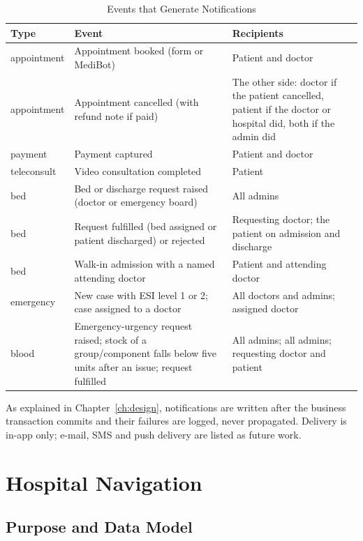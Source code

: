 \begin{table}[H]
\centering
\caption{Events that Generate Notifications}
\label{tab:notiftypes}
\renewcommand{\arraystretch}{1.2}
\begin{tabular}{|L{2.4cm}|L{5.8cm}|L{5.3cm}|}
\hline
{}
\textbf{Type} & \textbf{Event} & \textbf{Recipients} \\
\hline
appointment & Appointment booked (form or MediBot) & Patient and doctor \\
\hline
appointment & Appointment cancelled (with refund note if paid) & The other side: doctor if the patient cancelled, patient if the doctor or hospital did, both if the admin did \\
\hline
payment & Payment captured & Patient and doctor \\
\hline
teleconsult & Video consultation completed & Patient \\
\hline
bed & Bed or discharge request raised (doctor or emergency board) & All admins \\
\hline
bed & Request fulfilled (bed assigned or patient discharged) or rejected & Requesting doctor; the patient on admission and discharge \\
\hline
bed & Walk-in admission with a named attending doctor & Patient and attending doctor \\
\hline
emergency & New case with ESI level 1 or 2; case assigned to a doctor & All doctors and admins; assigned doctor \\
\hline
blood & Emergency-urgency request raised; stock of a group/component falls below five units after an issue; request fulfilled & All admins; all admins; requesting doctor and patient \\
\hline
\end{tabular}
\end{table}

As explained in Chapter~\ref{ch:design}, notifications are written after the business transaction commits and their failures are logged, never propagated. Delivery is in-app only; e-mail, SMS and push delivery are listed as future work.

\FloatBarrier
\section{Hospital Navigation}
\label{sec:mod-nav}

\subsection{Purpose and Data Model}

